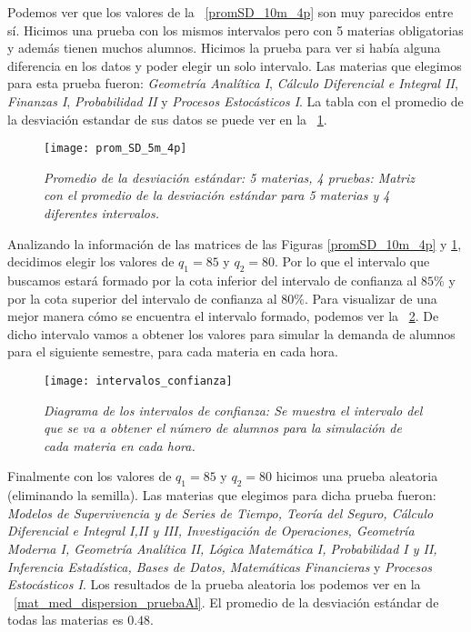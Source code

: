 Podemos ver que los valores de la \figurename{~\ref{promSD_10m_4p}} son muy parecidos entre sí. Hicimos una prueba con los mismos intervalos pero con 5 materias obligatorias y además tienen muchos alumnos. Hicimos la prueba para ver si había alguna diferencia en los datos y poder elegir un solo intervalo. Las materias que elegimos para esta prueba fueron: \textit{Geometría Analítica I}, \textit{Cálculo Diferencial e Integral II}, \textit{Finanzas I}, \textit{Probabilidad II} y \textit{Procesos Estocásticos I}. La tabla con el promedio de la desviación estandar de sus datos se puede ver en la \figurename{~\ref{promSD_5m_4p}}.


\begin{figure}[H]
\centering
\texttt{[image: prom\_SD\_5m\_4p]} %
\caption[\textit{Promedio de la desviación estándar: 5 materias, 4 pruebas}]{\textit{Promedio de la desviación estándar: 5 materias, 4 pruebas: Matriz con el promedio de la desviación estándar para 5 materias y 4 diferentes intervalos.}}\label{promSD_5m_4p}
\end{figure}

Analizando la información de las matrices de las Figuras \ref{promSD_10m_4p} y \ref{promSD_5m_4p}, decidimos elegir los valores de $q_{1} = 85$ y $q_{2} = 80$. Por lo que el intervalo que buscamos estará formado por la cota inferior del intervalo de confianza al $85\%$ y por la cota superior del intervalo de confianza al $80\%$. Para visualizar de una mejor manera cómo se encuentra el intervalo formado, podemos ver la \figurename{~\ref{interConf}}. De dicho intervalo vamos a obtener los valores para simular la demanda de alumnos para el siguiente semestre, para cada materia en cada hora.

\begin{figure}[H]
\centering
\texttt{[image: intervalos\_confianza]} %
\caption[\textit{Diagrama de los intervalos de confianza}]{\textit{Diagrama de los intervalos de confianza: Se muestra el intervalo del que se va a obtener el número de alumnos para la simulación de cada materia en cada hora.}}\label{interConf}
\end{figure}

Finalmente con los valores de $q_{1} = 85$ y $q_{2} = 80$ hicimos una prueba aleatoria (eliminando la semilla). Las materias que elegimos para dicha prueba fueron: \textit{Modelos de Supervivencia y de Series de Tiempo, Teoría del Seguro, Cálculo Diferencial e Integral I,II y III, Investigación de Operaciones, Geometría Moderna I, Geometría Analítica II, Lógica Matemática I, Probabilidad I y II, Inferencia Estadística, Bases de Datos, Matemáticas Financieras} y \textit{Procesos Estocásticos I}. Los resultados de la prueba aleatoria los podemos ver en la \figurename{~\ref{mat_med_dispersion_pruebaAl}}. El promedio de la desviación estándar de todas las materias es $0.48$.%

